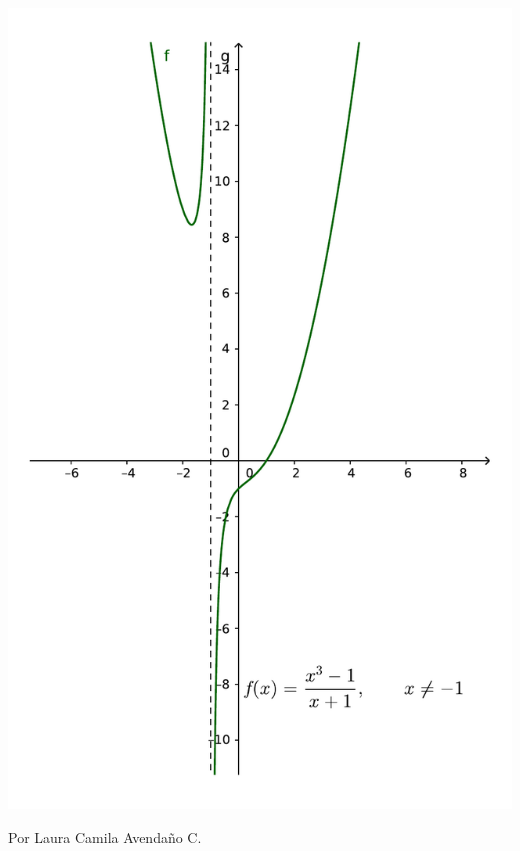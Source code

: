 \documentclass[11pt,letterpaper]{article}
\author{Laura Camila Avendaño C.}
\begin{document}
\begin{center}
\includegraphics[scale=.9,trim=0cm 0.5cm 0cm 0.5cm,clip]{Images/funcion01} 
\end{center}

Por Laura Camila Avendaño C.
\end{document}
